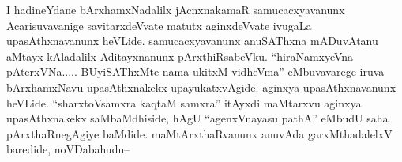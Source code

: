 \begin{artha}
I hadineYdane bArxhamxNadalilx jAcnxnakamaR samucacxyavanunx Acarisuvavanige savitarxdeVvate matutx aginxdeVvate ivugaLa upasAthxnavanunx heVLide. samucacxyavanunx anuSAThxna mADuvAtanu aMtayx kAladalilx Aditayxnanunx pArxthiRsabeVku. ``hiraNamxyeVna pAterxVNa..... BUyiSAThxMte nama ukitxM vidheVma'' eMbuvavarege iruva bArxhamxNavu upasAthxnakekx upayukatxvAgide. aginxya upasAthxnavanunx heVLide. ``sharxtoVsamxra kaqtaM samxra'' itAyxdi maMtarxvu aginxya upasAthxnakekx saMbaMdhiside, hAgU ``agenxVnayasu pathA'' eMbudU saha pArxthaRnegAgiye baMdide. maMtArxthaRvanunx anuvAda garxMthadalelxV baredide, noVDabahudu{\rm --}
\end{artha}

\centerline{}

